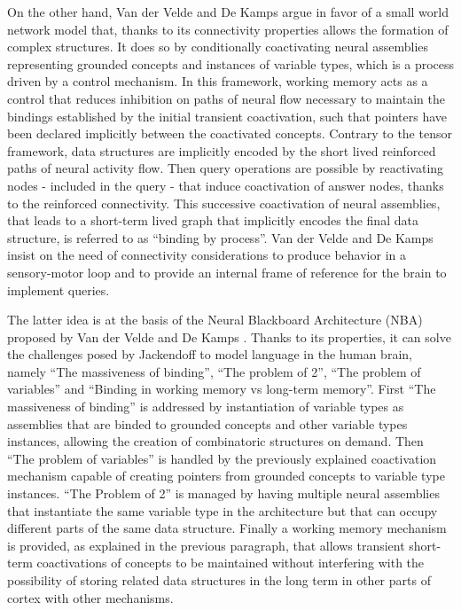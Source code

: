\documentclass[10pt]{article}
\begin{document}
On the other hand, Van der Velde and De Kamps \cite{van_der_Velde_2015} argue in favor of a small world network model that, thanks to its connectivity properties 
allows the formation of complex structures.
It does so by conditionally coactivating neural assemblies representing grounded concepts and instances of variable types, which is a process driven by a control mechanism.
In this framework, working memory acts as a control that reduces inhibition on paths of neural flow necessary to maintain the bindings 
established by the initial transient coactivation, such that pointers have been  declared implicitly between the coactivated concepts.
Contrary to the tensor framework, data structures are implicitly encoded by the short lived reinforced paths of neural activity flow.
Then query operations are possible by reactivating nodes - included in the query - that induce coactivation of answer nodes, thanks to the reinforced connectivity.
This successive coactivation of neural assemblies, that leads to a short-term lived graph that implicitly encodes the final data structure, 
is referred to as ``binding by process''.
Van der Velde and De Kamps insist on the need of connectivity considerations to produce behavior in a sensory-motor loop and to provide an internal frame of reference for the brain to implement queries.

The latter idea is at the basis of the Neural Blackboard Architecture (NBA) proposed by Van der Velde and De Kamps \cite{van_der_Velde_2006}. Thanks to its properties, 
it can solve the challenges posed by Jackendoff to model language in the human brain, namely ``The massiveness of binding'', ``The problem of 2'', ``The problem of variables'' and ``Binding in working memory vs long-term memory''.
First ``The massiveness of binding'' is addressed by instantiation of variable types as assemblies that are binded to grounded concepts and other variable types instances, 
allowing the creation of combinatoric structures on demand.
Then ``The problem of variables'' is handled by the previously explained coactivation mechanism capable of creating pointers from grounded concepts to variable type instances.
``The Problem of 2'' is managed by having multiple neural assemblies that instantiate the same variable type in the architecture but that can occupy different parts of the same data structure.
Finally a working memory mechanism is provided, as explained in the previous paragraph, that allows transient short-term coactivations of concepts to be maintained without interfering with the possibility of storing related data structures in the long term in other parts of cortex with other mechanisms.
\end{document}
